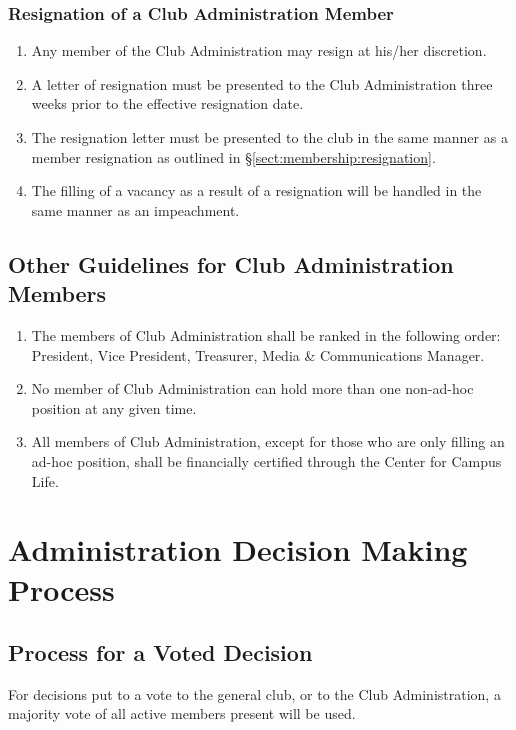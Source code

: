\documentclass[english,11pt]{article}
\begin{document}
\subsubsection{Resignation of a Club Administration Member} \label{subsect:cadmin:removal:resignation}

\begin{enumerate}[label=\alph*.]
\item Any member of the Club Administration may resign at his/her discretion.
\item A letter of resignation must be presented to the Club Administration three weeks prior to the effective resignation date.
\item The resignation letter must be presented to the club in the same manner as a member resignation as outlined in §\ref{sect:membership:resignation}.
\item The filling of a vacancy as a result of a resignation will be handled in the same manner as an impeachment.
\end{enumerate}

\subsection{Other Guidelines for Club Administration Members} \label{subsect:cadmin:other}

\begin{enumerate}[label=\Alph*.]
\item The members of Club Administration shall be ranked in the following order: President, Vice President, Treasurer, Media \& Communications Manager.
\item No member of Club Administration can hold more than one non-ad-hoc position at any given time.
\item All members of Club Administration, except for those who are only filling an ad-hoc position, shall be financially certified through the Center for Campus Life.
\end{enumerate}

\section{Administration Decision Making Process} \label{art:decision-making}

\subsection{Process for a Voted Decision} \label{sect:decision-making:voted}
For decisions put to a vote to the general club, or to the Club Administration, a majority vote of all active members present will be used.
\end{document}
